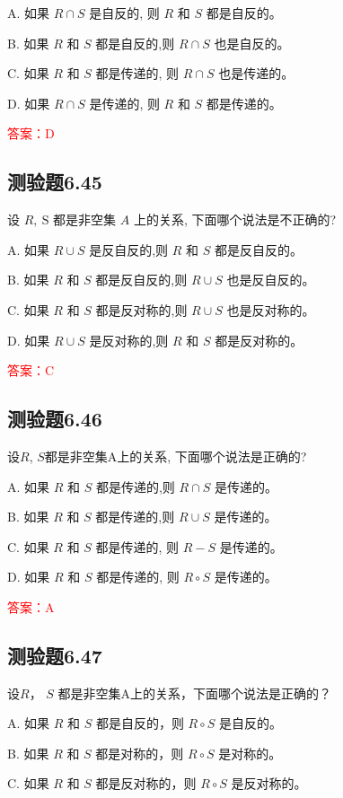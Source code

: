 \documentclass[UTF8, heading=true]{ctexart}
\begin{document}
A. 
如果 $R \cap S$ 是自反的, 则 $R$ 和 $S$ 都是自反的。

B. 
如果 $R$ 和 $S$ 都是自反的,则 $R \cap S$ 也是自反的。

C. 
如果 $R$ 和 $S$ 都是传递的, 则 $R \cap S$ 也是传递的。

D. 
如果 $R \cap S$ 是传递的, 则 $R$ 和 $S$ 都是传递的。

\textcolor{red}{答案：D}

\subsection{测验题6.45}

设 $R, \mathrm{~S}$ 都是非空集 $A$ 上的关系, 下面哪个说法是不正确的?

A. 如果 $R \cup S$ 是反自反的,则 $R$ 和 $S$ 都是反自反的。

B. 如果 $R$ 和 $S$ 都是反自反的,则 $R \cup S$ 也是反自反的。

C. 如果 $R$ 和 $S$ 都是反对称的,则 $R \cup S$ 也是反对称的。

D. 如果 $R \cup S$ 是反对称的,则 $R$ 和 $S$ 都是反对称的。

\textcolor{red}{答案：C}


\subsection{测验题6.46}

设$R$, $S$都是非空集A上的关系, 下面哪个说法是正确的?

A. 
如果 $R$ 和 $S$ 都是传递的,则 $R \cap S$ 是传递的。

B. 
如果 $R$ 和 $S$ 都是传递的,则 $R \cup S$ 是传递的。

C. 
如果 $R$ 和 $S$ 都是传递的, 则 $R-S$ 是传递的。

D. 
如果 $R$ 和 $S$ 都是传递的, 则 $R \circ S$ 是传递的。

\textcolor{red}{答案：A}

\subsection{测验题6.47}

设$R$， $S$ 都是非空集A上的关系，下面哪个说法是正确的？

A. 如果 $R$ 和 $S$ 都是自反的，则 $R \circ S$ 是自反的。

B. 
如果 $R$ 和 $S$ 都是对称的，则 $R \circ S$ 是对称的。

C. 
如果 $R$ 和 $S$ 都是反对称的，则 $R \circ S$ 是反对称的。
\end{document}
